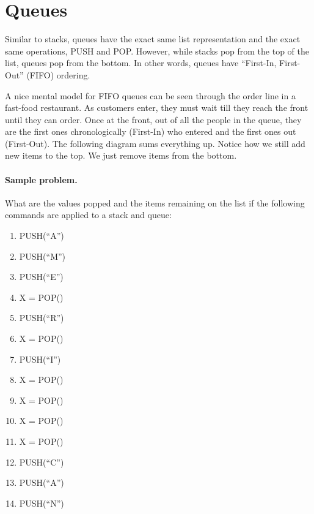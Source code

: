 \documentclass[10pt]{article}
\begin{document}
\section{Queues}
Similar to stacks, queues have the exact same list representation and the exact
same operations, PUSH and POP\@.
However, while stacks pop from the top of the list, queues pop from the bottom.
In other words, queues have ``First-In, First-Out'' (FIFO) ordering.

A nice mental model for FIFO queues can be seen through the order line
in a fast-food restaurant.
As customers enter, they must wait till they reach the front until they can order.
Once at the front, out of all the people in the queue,
they are the first ones chronologically (First-In) who entered
and the first ones out (First-Out).
The following diagram sums everything up.
Notice how we still add new items to the top.
We just remove items from the bottom.
\begin{center}
\end{center}

\paragraph{Sample problem.} What are the values popped and the items remaining
on the list if the following commands are applied to a stack and queue:
\begin{multicols}{4}
\begin{enumerate}
\item PUSH(``A'')
\item PUSH(``M'')
\item PUSH(``E'')
\item X = POP()
\item PUSH(``R'')
\item X = POP()
\item PUSH(``I'')
\item X = POP()
\item X = POP()
\item X = POP()
\item X = POP()
\item PUSH(``C'')
\item PUSH(``A'')
\item PUSH(``N'')
\end{enumerate}
\end{multicols}
\end{document}
